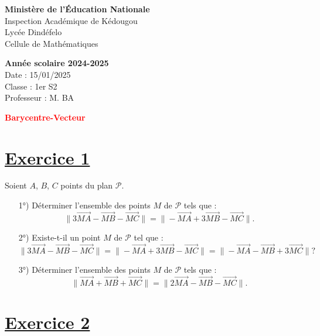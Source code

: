 \documentclass[12pt]{article}
\begin{document}
\noindent
\begin{minipage}[t]{0.48\textwidth}
\raggedright
\textbf{Ministère de l'Éducation Nationale}\\
Inspection Académique de Kédougou\\
Lycée Dindéfelo\\
Cellule de Mathématiques
\end{minipage}
\hfill
\begin{minipage}[t]{0.48\textwidth}
\raggedleft
\textbf{Année scolaire 2024-2025}\\
Date : 15/01/2025\\
Classe : 1er S2\\
Professeur : M. BA
\end{minipage}
\vspace{1cm}
\begin{center}
\textbf{\textcolor{red}{Barycentre-Vecteur}}
\end{center}
\vspace{1cm}

\section*{\underline{Exercice 1}}

Soient \( A \), \( B \), \( C \) points du plan \( \mathcal{P} \).

\begin{enumerate}
    \item[1°)] Déterminer l'ensemble des points \( M \) de \( \mathcal{P} \) tels que :
    \[
    \| 3 \overrightarrow{MA} - \overrightarrow{MB} - \overrightarrow{MC} \| = \| - \overrightarrow{MA} + 3 \overrightarrow{MB} - \overrightarrow{MC} \|.
    \]
    
    \item[2°)] Existe-t-il un point \( M \) de \( \mathcal{P} \) tel que :
    \[
    \| 3 \overrightarrow{MA} - \overrightarrow{MB} - \overrightarrow{MC} \| = \| - \overrightarrow{MA} + 3 \overrightarrow{MB} - \overrightarrow{MC} \| = \| - \overrightarrow{MA} - \overrightarrow{MB} + 3 \overrightarrow{MC} \| ?
    \]

    \item[3°)] Déterminer l'ensemble des points \( M \) de \( \mathcal{P} \) tels que :
    \[
    \| \overrightarrow{MA} + \overrightarrow{MB} + \overrightarrow{MC} \| =  \| 2\overrightarrow{MA} - \overrightarrow{MB} - \overrightarrow{MC} \|.
    \]
\end{enumerate}

\section*{\underline{Exercice 2}}
\end{document}
